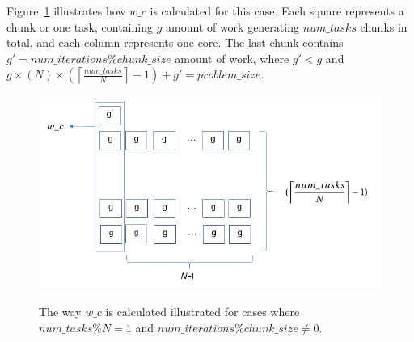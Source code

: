 Figure~\ref{fig58} illustrates how $w\_c$ is calculated for this case. Each square represents a chunk or one task, containing $g$ amount of work generating $num\_{tasks}$ chunks in total, and each column represents one core. The last chunk contains $g'=num\_{iterations}\%chunk\_{size}$ amount of work, where $g'<g$ and $g\times{(N)}\times(\left \lceil{\frac{num\_{tasks}}{N}}\right \rceil-1)+g'=problem\_{size}$.

\begin{figure}[H]
	\centering
	{\includegraphics[scale=.3]{images/w_c_explained.png}}
	\caption{The way $w\_c$ is calculated illustrated for cases where $num\_{tasks}\%N=1$ and  $num\_{iterations}\%chunk\_{size}\neq0$.}\label{fig58}		
\end{figure}


  

\vspace{\baselineskip}

